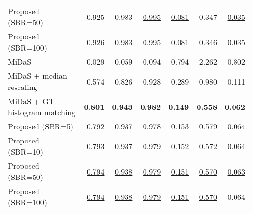 {\begin{tabular}{lrrr|rrr}
Proposed (SBR=50)                  &               0.925 &               0.983 &   \underline{0.995} &  \underline{0.081} &              0.347 &  \underline{0.035} \\
Proposed (SBR=100)                 &   \underline{0.926} &               0.983 &   \underline{0.995} &  \underline{0.081} &  \underline{0.346} &  \underline{0.035} \\
\midrule
MiDaS                              &               0.029 &               0.059 &               0.094 &              0.794 &              2.262 &              0.802 \\
MiDaS + median rescaling           &               0.574 &               0.826 &               0.928 &              0.289 &              0.980 &              0.111 \\
MiDaS + GT histogram matching      &      \textbf{0.801} &      \textbf{0.943} &      \textbf{0.982} &     \textbf{0.149} &     \textbf{0.558} &     \textbf{0.062} \\
Proposed (SBR=5)                   &               0.792 &               0.937 &               0.978 &              0.153 &              0.579 &              0.064 \\
Proposed (SBR=10)                  &               0.793 &               0.937 &   \underline{0.979} &              0.152 &              0.572 &              0.064 \\
Proposed (SBR=50)                  &   \underline{0.794} &   \underline{0.938} &   \underline{0.979} &  \underline{0.151} &  \underline{0.570} &  \underline{0.063} \\
Proposed (SBR=100)                 &   \underline{0.794} &   \underline{0.938} &   \underline{0.979} &  \underline{0.151} &  \underline{0.570} &              0.064 \\
\bottomrule
\end{tabular}
}